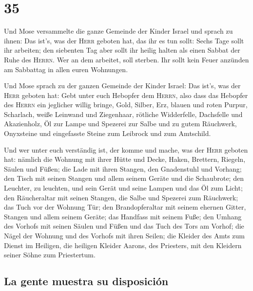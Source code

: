 \hypertarget{section-34}{%
\section{35}\label{section-34}}

 Und Mose versammelte die ganze Gemeinde der Kinder Israel
und sprach zu ihnen: Das ist's, was der \textsc{Herr} geboten hat, das
ihr es tun sollt:  Sechs Tage sollt ihr arbeiten; den
siebenten Tag aber sollt ihr heilig halten als einen Sabbat der Ruhe des
\textsc{Herrn}. Wer an dem arbeitet, soll sterben.  Ihr
sollt kein Feuer anzünden am Sabbattag in allen euren Wohnungen.

 Und Mose sprach zu der ganzen Gemeinde der Kinder Israel:
Das ist's, was der \textsc{Herr} geboten hat:  Gebt unter
euch Hebopfer dem \textsc{Herrn}, also dass das Hebopfer des
\textsc{Herrn} ein jeglicher willig bringe, Gold, Silber, Erz,
 blauen und roten Purpur, Scharlach, weiße Leinwand und
Ziegenhaar,  rötliche Widderfelle, Dachsfelle und
Akazienholz,  Öl zur Lampe und Spezerei zur Salbe und zu
gutem Räuchwerk,  Onyxsteine und eingefasste Steine zum
Leibrock und zum Amtschild.

 Und wer unter euch verständig ist, der komme und mache,
was der \textsc{Herr} geboten hat:  nämlich die Wohnung
mit ihrer Hütte und Decke, Haken, Brettern, Riegeln, Säulen und Füßen;
 die Lade mit ihren Stangen, den Gnadenstuhl und Vorhang;
 den Tisch mit seinen Stangen und allem seinem Geräte und
die Schaubrote;  den Leuchter, zu leuchten, und sein
Gerät und seine Lampen und das Öl zum Licht;  den
Räucheraltar mit seinen Stangen, die Salbe und Spezerei zum Räuchwerk;
das Tuch vor der Wohnung Tür;  den Brandopferaltar mit
seinem ehernen Gitter, Stangen und allem seinem Geräte; das Handfass mit
seinem Fuße;  den Umhang des Vorhofs mit seinen Säulen
und Füßen und das Tuch des Tors am Vorhof;  die Nägel der
Wohnung und des Vorhofs mit ihren Seilen;  die Kleider
des Amts zum Dienst im Heiligen, die heiligen Kleider Aarons, des
Priesters, mit den Kleidern seiner Söhne zum Priestertum.

\hypertarget{la-gente-muestra-su-disposiciuxf3n}{%
\subsection{La gente muestra su
disposición}\label{la-gente-muestra-su-disposiciuxf3n}}

